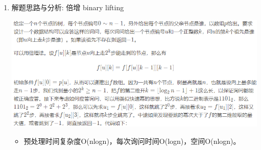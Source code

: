 \documentclass[9pt, b5paaper]{book}
\begin{document}
\begin{enumerate}
\item 解题思路与分析: 倍增 binary lifting
\label{sec-1-1-6-1}

\includegraphics[width=.9\linewidth]{./pic/1483.png}

\begin{itemize}
\item 预处理时间复杂度O(nlogn)，每次询问时间O(logn)，空间O(nlogn)。


\end{itemize}
\end{enumerate}
\end{document}
